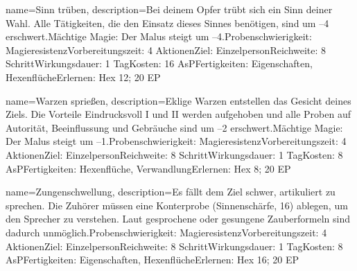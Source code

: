 {
    name={Sinn trüben},
    description={Bei deinem Opfer trübt sich ein Sinn deiner Wahl. Alle Tätigkeiten, die den Einsatz dieses Sinnes benötigen, sind um –4 erschwert.\newline Mächtige Magie: Der Malus steigt um –4.\newline Probenschwierigkeit: Magieresistenz\newline Vorbereitungszeit: 4 Aktionen\newline Ziel: Einzelperson\newline Reichweite: 8 Schritt\newline Wirkungsdauer: 1 Tag\newline Kosten: 16 AsP\newline Fertigkeiten: Eigenschaften, Hexenflüche\newline Erlernen: Hex 12; 20 EP}
}


{
    name={Warzen sprießen},
    description={Eklige Warzen entstellen das Gesicht deines Ziels. Die Vorteile Eindrucksvoll I und II werden aufgehoben und alle Proben auf Autorität, Beeinflussung  und Gebräuche sind um –2 erschwert.\newline Mächtige Magie: Der Malus steigt um –1.\newline Probenschwierigkeit: Magieresistenz\newline Vorbereitungszeit: 4 Aktionen\newline Ziel: Einzelperson\newline Reichweite: 8 Schritt\newline Wirkungsdauer: 1 Tag\newline Kosten: 8 AsP\newline Fertigkeiten: Hexenflüche, Verwandlung\newline Erlernen: Hex 8; 20 EP}
}


{
    name={Zungenschwellung},
    description={Es fällt dem Ziel schwer, artikuliert zu sprechen. Die Zuhörer müssen eine Konterprobe (Sinnenschärfe, 16) ablegen, um den Sprecher zu verstehen. Laut gesprochene oder gesungene Zauberformeln sind dadurch unmöglich.\newline Probenschwierigkeit: Magieresistenz\newline Vorbereitungszeit: 4 Aktionen\newline Ziel: Einzelperson\newline Reichweite: 8 Schritt\newline Wirkungsdauer: 1 Tag\newline Kosten: 8 AsP\newline Fertigkeiten: Eigenschaften, Hexenflüche\newline Erlernen: Hex 16; 20 EP}
}


